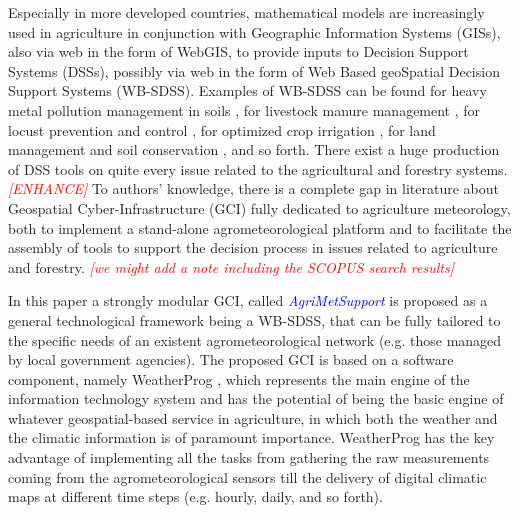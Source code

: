 \documentclass[authoryear,preprint,review,12pt]{elsarticle}
\newcommand{\note}[1]{\emph{\textcolor{red}{#1}}}
\newcommand{\update}[1]{\emph{\textcolor{blue}{#1}}}
\newcommand{\gci}{\update{AgriMetSupport}\xspace}
\begin{document}
Especially in more developed countries, mathematical models are increasingly used in agriculture in conjunction with Geographic Information Systems (GISs), also via web in the form of WebGIS, to provide inputs to Decision Support Systems (DSSs), possibly via web in the form of Web Based geoSpatial Decision Support Systems (WB-SDSS).
Examples of WB-SDSS can be found 
for heavy metal pollution management in soils \citep{Wang:wbsdss:2005}, 
for livestock manure management \citep{Acutis:wbsdss:2014}, 
for locust prevention and control \citep{Yao:wbsdss:2017}, 
for optimized crop irrigation \citep{Giusti:wbsdss:2015}, 
for land management and soil conservation \citep{Terribile:soilconsweb:2015}, 
and so forth.
There exist a huge production of DSS tools on quite every issue related to the agricultural and forestry systems.
\note{[ENHANCE]} To authors' knowledge, there is a complete gap in literature about Geospatial Cyber-Infrastructure (GCI) fully dedicated to agriculture meteorology, both to implement a stand-alone agrometeorological platform and to facilitate the assembly of tools to support the decision process in issues related to agriculture and forestry. \note{[we might add a note including the SCOPUS search results]}

In this paper a strongly modular GCI, called \gci
is proposed as a general technological framework being a WB-SDSS, that can be fully tailored to the specific needs of an existent agrometeorological network (e.g. those managed by local government agencies).
The proposed GCI is based on a software component, namely WeatherProg \citep{langella:weatherprog2014,langella:weatherprog2016}, which represents the main engine of the information technology system and has the potential of being the basic engine of whatever geospatial-based service in agriculture, in which both the weather and the climatic information is of paramount importance.
WeatherProg has the key advantage of implementing all the tasks from gathering the raw measurements coming from the agrometeorological sensors till the delivery of digital climatic maps at different time steps (e.g. hourly, daily, and so forth).
\end{document}
